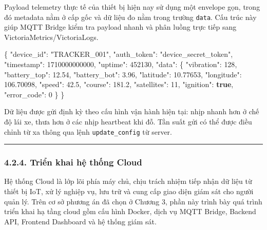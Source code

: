 \documentclass[13pt,a4paper]{extarticle}
\newenvironment{Shaded}{}{}
\newcommand{\DataTypeTok}[1]{\textcolor[rgb]{0.56,0.13,0.00}{#1}}
\newcommand{\DecValTok}[1]{\textcolor[rgb]{0.25,0.63,0.44}{#1}}
\newcommand{\FloatTok}[1]{\textcolor[rgb]{0.25,0.63,0.44}{#1}}
\newcommand{\FunctionTok}[1]{\textcolor[rgb]{0.02,0.16,0.49}{#1}}
\newcommand{\KeywordTok}[1]{\textcolor[rgb]{0.00,0.44,0.13}{\textbf{#1}}}
\newcommand{\StringTok}[1]{\textcolor[rgb]{0.25,0.44,0.63}{#1}}
\renewcommand{\\}{\thesislongtableorignewline\hline}%
\begin{document}
Payload telemetry thực tế của thiết bị hiện nay sử dụng một envelope
gọn, trong đó metadata nằm ở cấp gốc và dữ liệu đo nằm trong trường
\texttt{data}. Cấu trúc này giúp MQTT Bridge kiểm tra payload nhanh và
phân luồng trực tiếp sang VictoriaMetrics/VictoriaLogs.

\begin{Shaded}
\begin{Highlighting}[]
\FunctionTok{\{}
  \DataTypeTok{"device\_id"}\FunctionTok{:} \StringTok{"TRACKER\_001"}\FunctionTok{,}
  \DataTypeTok{"auth\_token"}\FunctionTok{:} \StringTok{"device\_secret\_token"}\FunctionTok{,}
  \DataTypeTok{"timestamp"}\FunctionTok{:} \DecValTok{1710000000000}\FunctionTok{,}
  \DataTypeTok{"uptime"}\FunctionTok{:} \DecValTok{452130}\FunctionTok{,}
  \DataTypeTok{"data"}\FunctionTok{:} \FunctionTok{\{}
    \DataTypeTok{"vibration"}\FunctionTok{:} \DecValTok{128}\FunctionTok{,}
    \DataTypeTok{"battery\_top"}\FunctionTok{:} \FloatTok{12.54}\FunctionTok{,}
    \DataTypeTok{"battery\_bot"}\FunctionTok{:} \FloatTok{3.96}\FunctionTok{,}
    \DataTypeTok{"latitude"}\FunctionTok{:} \FloatTok{10.77653}\FunctionTok{,}
    \DataTypeTok{"longitude"}\FunctionTok{:} \FloatTok{106.70098}\FunctionTok{,}
    \DataTypeTok{"speed"}\FunctionTok{:} \FloatTok{42.5}\FunctionTok{,}
    \DataTypeTok{"course"}\FunctionTok{:} \FloatTok{181.2}\FunctionTok{,}
    \DataTypeTok{"satellites"}\FunctionTok{:} \DecValTok{11}\FunctionTok{,}
    \DataTypeTok{"ignition"}\FunctionTok{:} \KeywordTok{true}\FunctionTok{,}
    \DataTypeTok{"error\_code"}\FunctionTok{:} \DecValTok{0}
  \FunctionTok{\}}
\FunctionTok{\}}
\end{Highlighting}
\end{Shaded}

Dữ liệu được gửi định kỳ theo cấu hình vận hành hiện tại: nhịp nhanh hơn
ở chế độ lái xe, thưa hơn ở các nhịp heartbeat khi đỗ. Tần suất gửi có
thể được điều chỉnh từ xa thông qua lệnh \texttt{update\_config} từ
server.

\begin{center}\rule{0.5\linewidth}{0.5pt}\end{center}

\subsubsection{4.2.4. Triển khai hệ thống Cloud}

Hệ thống Cloud là lớp lõi phía máy chủ, chịu trách nhiệm tiếp nhận dữ
liệu từ thiết bị IoT, xử lý nghiệp vụ, lưu trữ và cung cấp giao diện
giám sát cho người quản lý. Trên cơ sở phương án đã chọn ở Chương 3,
phần này trình bày quá trình triển khai hạ tầng cloud gồm cấu hình
Docker, dịch vụ MQTT Bridge, Backend API, Frontend Dashboard và hệ thống
giám sát.
\end{document}
